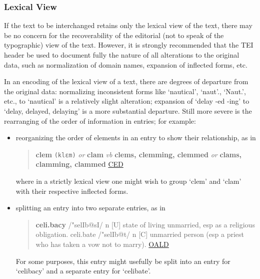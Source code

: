 \subsubsection[{Lexical View}]{Lexical View}\label{DIMVLV}\par
If the text to be interchanged retains only the lexical view of the text, there may be no concern for the recoverability of the editorial (not to speak of the typographic) view of the text. However, it is strongly recommended that the TEI header be used to document fully the nature of all alterations to the original data, such as normalization of domain names, expansion of inflected forms, etc. \par
In an encoding of the lexical view of a text, there are degrees of departure from the original data: normalizing inconsistent forms like ‘nautical’, ‘naut’., ‘Naut.’, etc., to ‘nautical’ is a relatively slight alteration; expansion of ‘delay -ed -ing’ to ‘delay, delayed, delaying’ is a more substantial departure. Still more severe is the rearranging of the order of information in entries; for example:\begin{itemize}
\item reorganizing the order of elements in an entry to show their relationship, as in 
\begin{quote}{\bfseries clem} \texttt{(klɛm)} {\itshape or} {\bfseries clam} {\itshape vb} {\bfseries clems, clemming, clemmed} {\itshape or} {\bfseries clams, clamming, clammed} \hyperref[DIC-CED]{CED}\end{quote}
 where in a strictly lexical view one might wish to group ‘clem’ and ‘clam’ with their respective inflected forms.
\item splitting an entry into two separate entries, as in 
\begin{quote}{\bfseries celi.bacy} /"selIb@sI/ n [U] state of living unmarried, esp as a religious obligation. celi.bate /"selIb@t/ n [C] unmarried person (esp a priest who has taken a vow not to marry). \hyperref[DIC-OALD]{OALD}\end{quote}
 For some purposes, this entry might usefully be split into an entry for ‘celibacy’ and a separate entry for ‘celibate’.
\end{itemize} \par
